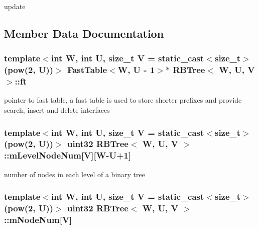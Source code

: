 update 



\subsection{Member Data Documentation}
\hypertarget{classRBTree_a054f43074586a88ce2632cbaca07fa0b}{
\subsubsection[{ft}]{\setlength{\rightskip}{0pt plus 5cm}template$<$int W, int U, size\-\_\-t V = static\-\_\-cast$<$size\-\_\-t$>$(pow(2, U))$>$ {\bf Fast\-Table}$<${\bf W}, U -\/ 1$>$$\ast$ {\bf R\-B\-Tree}$<$ {\bf W}, U, V $>$\-::ft\hspace{0.3cm}{\ttfamily [private]}}}\label{classRBTree_a054f43074586a88ce2632cbaca07fa0b}


pointer to fast table, a fast table is used to store shorter prefixes and provide search, insert and delete interfaces 

\hypertarget{classRBTree_aeaf334c4db430ec17c09d13845888a7f}{
\subsubsection[{m\-Level\-Node\-Num}]{\setlength{\rightskip}{0pt plus 5cm}template$<$int W, int U, size\-\_\-t V = static\-\_\-cast$<$size\-\_\-t$>$(pow(2, U))$>$ {\bf uint32} {\bf R\-B\-Tree}$<$ {\bf W}, U, V $>$\-::m\-Level\-Node\-Num\mbox{[}V\mbox{]}\mbox{[}{\bf W}-\/U+1\mbox{]}\hspace{0.3cm}{\ttfamily [private]}}}\label{classRBTree_aeaf334c4db430ec17c09d13845888a7f}


number of nodes in each level of a binary tree 

\hypertarget{classRBTree_a0b1d29091a098e2ba8d1f89df1e9b1cc}{
\subsubsection[{m\-Node\-Num}]{\setlength{\rightskip}{0pt plus 5cm}template$<$int W, int U, size\-\_\-t V = static\-\_\-cast$<$size\-\_\-t$>$(pow(2, U))$>$ {\bf uint32} {\bf R\-B\-Tree}$<$ {\bf W}, U, V $>$\-::m\-Node\-Num\mbox{[}V\mbox{]}\hspace{0.3cm}{\ttfamily [private]}}}\label{classRBTree_a0b1d29091a098e2ba8d1f89df1e9b1cc}


